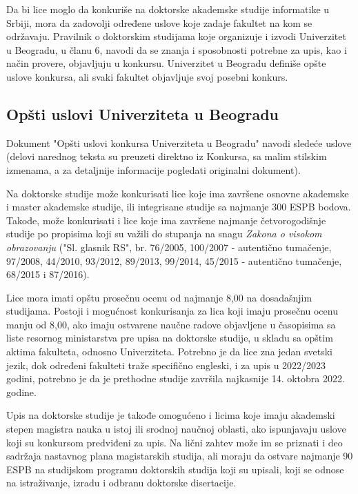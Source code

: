 \documentclass[a4paper]{article}
\begin{document}
Da bi lice moglo da konkuriše na doktorske akademske studije informatike u Srbiji, mora da zadovolji određene uslove koje zadaje fakultet na kom se održavaju. Pravilnik o doktorskim studijama koje organizuje i izvodi Univerzitet u Beogradu\cite{pravilnik}, u članu 6, navodi da se znanja i sposobnosti potrebne za upis, kao i način provere, objavljuju u konkursu. Univerzitet u Beogradu definiše opšte uslove konkursa, ali svaki fakultet objavljuje svoj posebni konkurs. 

\subsection{Opšti uslovi Univerziteta u Beogradu}

Dokument "Opšti uslovi konkursa Univerziteta u Beogradu"\cite{konkursBeograd} navodi sledeće uslove (delovi narednog teksta su preuzeti direktno iz Konkursa, sa malim stilskim izmenama, a za detaljnije informacije pogledati originalni dokument). 

Na doktorske studije može konkurisati lice koje ima završene osnovne akademske i master akademske studije, ili integrisane studije sa najmanje 300 ESPB bodova. Takođe, može konkurisati i lice koje ima završene najmanje četvorogodišnje studije po propisima koji su važili do stupanja na snagu \emph{Zakona o visokom obrazovanju} ("Sl. glasnik RS", br. 76/2005, 100/2007 - autentično tumačenje, 97/2008, 44/2010, 93/2012, 89/2013, 99/2014, 45/2015 - autentično tumačenje, 68/2015 i 87/2016). 

Lice mora imati opštu prosečnu ocenu od najmanje 8,00 na dosadašnjim studijama. Postoji i mogućnost konkurisanja za lica koji imaju prosečnu ocenu manju od 8,00, ako imaju ostvarene naučne radove objavljene u časopisima sa liste resornog ministarstva pre upisa na doktorske studije, u skladu sa opštim aktima fakulteta, odnosno Univerziteta. Potrebno je da lice zna jedan svetski jezik, dok određeni fakulteti traže specifično engleski, i za upis u 2022/2023 godini, potrebno je da je prethodne studije završila najkasnije 14. oktobra 2022. godine. 

Upis na doktorske studije je takođe omogućeno i licima koje imaju akademski stepen magistra nauka u istoj ili srodnoj naučnoj oblasti, ako ispunjavaju uslove koji su konkursom predviđeni za upis. Na lični zahtev može im se priznati i deo sadržaja nastavnog plana magistarskih studija, ali moraju da ostvare najmanje 90 ESPB na studijskom programu doktorskih studija koji su upisali, koji se odnose na istraživanje, izradu i odbranu doktorske disertacije. 
\end{document}
